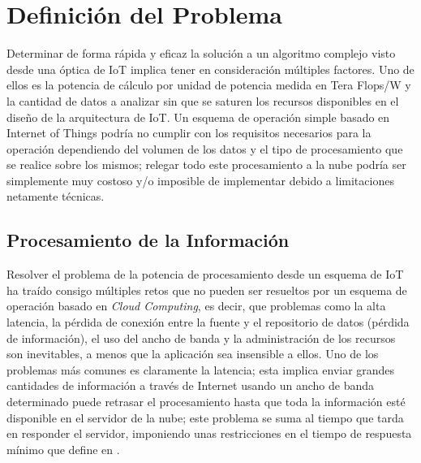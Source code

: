 
\chapter{Definición del Problema} %
\label{Chapter2}


Determinar de forma rápida y eficaz la solución a un algoritmo complejo visto desde una óptica de IoT implica tener en consideración múltiples factores. Uno de ellos es la potencia de cálculo por unidad de potencia medida en Tera Flops/W y la cantidad de datos a analizar sin que se saturen los recursos disponibles en el diseño de la arquitectura de IoT. Un esquema de operación simple basado en Internet of Things podría no cumplir con los requisitos necesarios para la operación dependiendo del volumen de los datos y el tipo de procesamiento que se realice sobre los mismos; relegar todo este procesamiento a la nube podría ser simplemente muy costoso y/o imposible de implementar debido a limitaciones netamente técnicas.



\section{Procesamiento de la Información}

Resolver el problema de la potencia de procesamiento desde un esquema de IoT ha traído consigo múltiples retos que no pueden ser resueltos por un esquema de operación basado en \textit{Cloud Computing}, es decir, que problemas como la alta latencia, la pérdida de conexión entre la fuente y el repositorio de datos (pérdida de información), el uso del ancho de banda y la administración de los recursos son inevitables, a menos que la aplicación sea insensible a ellos. Uno de los problemas más comunes es claramente la latencia; esta implica enviar grandes cantidades de información a través de Internet usando un ancho de banda determinado puede retrasar el procesamiento hasta que toda la información esté disponible en el servidor de la nube; este problema se suma al tiempo que tarda en responder el servidor, imponiendo unas restricciones en el tiempo de respuesta mínimo que define en \citep{RTSSystems}.

